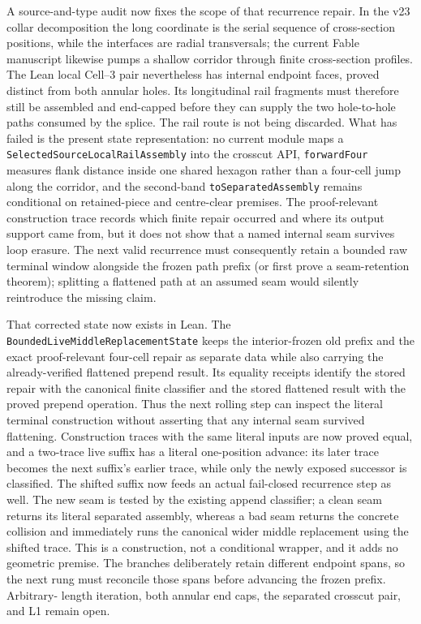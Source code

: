 \documentclass[11pt]{article}
\theoremstyle{definition}
\begin{document}
A source-and-type audit now fixes the scope of that recurrence repair.  In
the v23 collar decomposition the long coordinate is the serial sequence of
cross-section positions, while the interfaces are radial transversals; the
current Fable manuscript likewise pumps a shallow corridor through finite
cross-section profiles.  The Lean local Cell--3 pair nevertheless has internal
endpoint faces, proved distinct from both annular holes.  Its longitudinal
rail fragments must therefore still be assembled and end-capped before they
can supply the two hole-to-hole paths consumed by the splice.  The rail route
is not being discarded.  What has failed is the present state representation:
no current module maps a
\texttt{SelectedSourceLocalRailAssembly} into the crosscut API,
\texttt{forwardFour} measures flank distance inside one shared hexagon rather
than a four-cell jump along the corridor, and the second-band
\texttt{toSeparatedAssembly} remains conditional on retained-piece and
centre-clear premises.  The proof-relevant construction trace records which
finite repair occurred and where its output support came from, but it does not
show that a named internal seam survives loop erasure.  The next valid
recurrence must consequently retain a bounded raw terminal window alongside
the frozen path prefix (or first prove a seam-retention theorem); splitting a
flattened path at an assumed seam would silently reintroduce the missing claim.

That corrected state now exists in Lean.  The
\texttt{BoundedLiveMiddleReplacementState} keeps the interior-frozen old
prefix and the exact proof-relevant four-cell repair as separate data while
also carrying the already-verified flattened prepend result.  Its equality
receipts identify the stored repair with the canonical finite classifier and
the stored flattened result with the proved prepend operation.  Thus the next
rolling step can inspect the literal terminal construction without asserting
that any internal seam survived flattening.  Construction traces with the same
literal inputs are now proved equal, and a two-trace live suffix has a literal
one-position advance: its later trace becomes the next suffix's earlier trace,
while only the newly exposed successor is classified.  The shifted suffix now
feeds an actual fail-closed recurrence step as well.  The new seam is tested by
the existing append classifier; a clean seam returns its literal separated
assembly, whereas a bad seam returns the concrete collision and immediately
runs the canonical wider middle replacement using the shifted trace.  This is
a construction, not a conditional wrapper, and it adds no geometric premise.
The branches deliberately retain different endpoint spans, so the next rung
must reconcile those spans before advancing the frozen prefix.  Arbitrary-
length iteration, both annular end caps, the separated crosscut pair, and L1
remain open.
\end{document}
